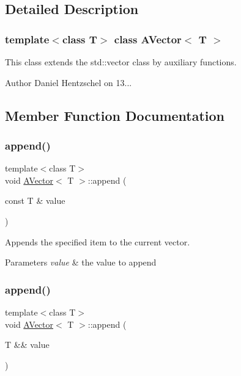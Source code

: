 \subsection{Detailed Description}
\subsubsection*{template$<$class T$>$\newline
class A\+Vector$<$ T $>$}

This class extends the std\+::vector class by auxiliary functions. 

\begin{DoxyAuthor}{Author}
Daniel Hentzschel on 13... 
\end{DoxyAuthor}


\subsection{Member Function Documentation}
\mbox{\label{class_a_vector_ab998b222eb341c26f4eafd8da65f2274}} 
\subsubsection{\texorpdfstring{append()}{append()}\hspace{0.1cm}{\footnotesize\ttfamily [1/2]}}
{\footnotesize\ttfamily template$<$class T$>$ \\
void \mbox{\hyperlink{class_a_vector}{A\+Vector}}$<$ T $>$\+::append (\begin{DoxyParamCaption}\item[{const T \&}]{value }\end{DoxyParamCaption})}



Appends the specified item to the current vector. 


\begin{DoxyParams}{Parameters}
{\em value} & the value to append \\
\hline
\end{DoxyParams}
\mbox{\label{class_a_vector_aae594c91729d29605c2fe4a71cbf6f0c}} 
\subsubsection{\texorpdfstring{append()}{append()}\hspace{0.1cm}{\footnotesize\ttfamily [2/2]}}
{\footnotesize\ttfamily template$<$class T$>$ \\
void \mbox{\hyperlink{class_a_vector}{A\+Vector}}$<$ T $>$\+::append (\begin{DoxyParamCaption}\item[{T \&\&}]{value }\end{DoxyParamCaption})}



